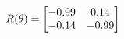 \documentclass[preview]{standalone}
\begin{document}
\begin{align*}
\special{dvisvgm:raw <g id='unique000'>}R(\theta) = \begin{bmatrix}-0.99 & 0.14\\-0.14 & -0.99\end{bmatrix}\special{dvisvgm:raw </g>}
\end{align*}
\end{document}
